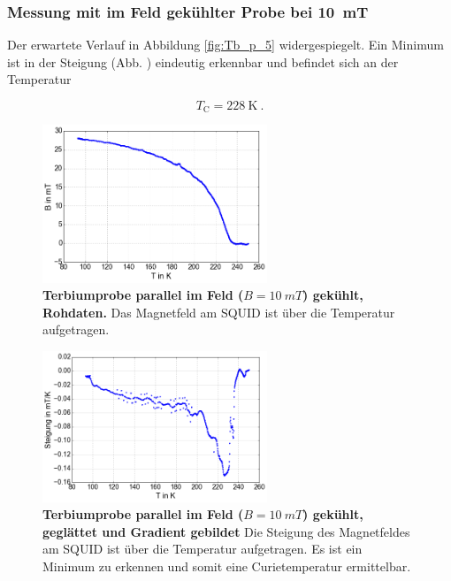 \documentclass[a4paper,ngerman]{scrartcl}
\begin{document}
\subsubsection*{Messung mit im Feld gekühlter Probe bei \SI{10}{mT}}

Der erwartete Verlauf in Abbildung \ref{fig:Tb_p_5} widergespiegelt.
Ein Minimum ist in der Steigung (Abb. ) eindeutig erkennbar und befindet sich an der Temperatur

\begin{equation}
T_{\mathrm{C}} = \SI{228}{\K} ~.
\end{equation}



\begin{figure}
\centering
\includegraphics[width=0.6\textwidth]{abbildungen/Tb_p_10.png}
\caption[Terbiumprobe parallel bei 10mT]{\textbf{Terbiumprobe parallel im Feld ($B = \SI{10}{mT}$) gekühlt, Rohdaten.} 
Das Magnetfeld am SQUID ist über die Temperatur aufgetragen. }
\label{fig:Tb_p_10}
\end{figure}

\begin{figure}
\centering
\includegraphics[width=0.6\textwidth]{abbildungen/Tb_p_10_grad.png}
\caption[Terbiumprobe parallel bei 10mT]{\textbf{Terbiumprobe parallel im Feld ($B = \SI{10}{mT}$) gekühlt, geglättet und Gradient gebildet} 
Die Steigung des Magnetfeldes am SQUID ist über die Temperatur aufgetragen. 
Es ist ein Minimum zu erkennen und somit eine Curietemperatur ermittelbar.}
\label{fig:Tb_p_10_grad}
\end{figure}
\end{document}

